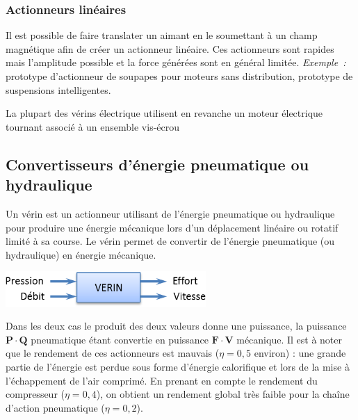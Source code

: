 \subsubsection{Actionneurs linéaires}

Il est possible de faire translater un aimant en le soumettant à un
champ magnétique afin de créer un actionneur linéaire. Ces actionneurs
sont rapides mais l'amplitude possible et la force générées sont en
général limitée. \emph{Exemple~:} prototype d'actionneur de soupapes
pour moteurs sans distribution, prototype de suspensions intelligentes.

La plupart des vérins électrique utilisent en revanche un moteur
électrique tournant associé à un ensemble vis-écrou

\subsection{Convertisseurs d'énergie pneumatique ou hydraulique}


Un vérin est un actionneur utilisant de l'énergie pneumatique ou
hydraulique pour produire une énergie mécanique lors d'un déplacement
linéaire ou rotatif limité à sa course. Le vérin permet de convertir de
l'énergie pneumatique (ou hydraulique) en énergie mécanique.

\includegraphics[width=2.9994in,height=0.52326in]{media/image74.png}

Dans les deux cas le produit des deux valeurs donne une puissance, la
puissance \(\mathbf{P \cdot Q}\) pneumatique étant convertie en
puissance \(\mathbf{F \cdot V}\) mécanique. Il est à noter que le
rendement de ces actionneurs est mauvais (\(\eta = 0,5\) environ) : une
grande partie de l'énergie est perdue sous forme d'énergie calorifique
et lors de la mise à l'échappement de l'air comprimé. En prenant en
compte le rendement du compresseur (\(\eta = 0,4\)), on obtient un
rendement global très faible pour la chaîne d'action pneumatique
(\(\eta = 0,2\)). 

